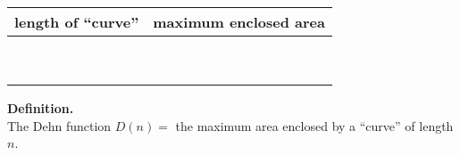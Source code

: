 \documentclass[12pt]{handout}
\begin{document}
\large
\begin{center}
\begin{tabular}{|l|l|}
  \hline
  length of ``curve'' & maximum enclosed area \\
  \hline & \\
  \hline & \\
  \hline & \\
  \hline & \\
  \hline & \\
  \hline & \\
  \hline & \\
  \hline & \\
  \hline & \\
  \hline
\end{tabular}
\hfill
\parbox{0.25\textwidth}{\normalsize \textbf{Definition.} \\ The Dehn function $D(n) = $ the maximum area
  enclosed by a ``curve'' of length $n$.}
\hfill
\null
\end{center}

\vfill

\end{document}

